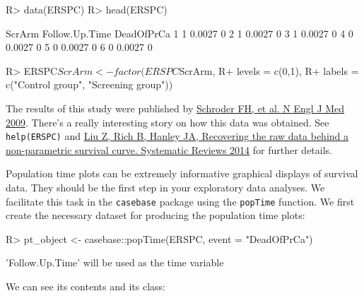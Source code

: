 \documentclass[article]{jss}
\begin{document}
\begin{CodeChunk}

\begin{CodeInput}
R> data(ERSPC)
R> head(ERSPC)
\end{CodeInput}

\begin{CodeOutput}
  ScrArm Follow.Up.Time DeadOfPrCa
1      1         0.0027          0
2      1         0.0027          0
3      1         0.0027          0
4      0         0.0027          0
5      0         0.0027          0
6      0         0.0027          0
\end{CodeOutput}

\begin{CodeInput}
R> ERSPC$ScrArm <- factor(ERSPC$ScrArm, 
R+                        levels = c(0,1), 
R+                        labels = c("Control group", "Screening group"))
\end{CodeInput}
\end{CodeChunk}

The results of this study were published by
\href{https://github.com/sahirbhatnagar/casebase/blob/master/references/Schroder_et_al-2009-NEJM.pdf}{Schroder
FH, et al. N Engl J Med 2009}. There's a really interesting story on how
this data was obtained. See \texttt{help(ERSPC)} and
\href{https://github.com/sahirbhatnagar/casebase/blob/master/references/Liu_et_al-2015-Systematic_Reviews.pdf}{Liu
Z, Rich B, Hanley JA, Recovering the raw data behind a non-parametric
survival curve. Systematic Reviews 2014} for further details.

Population time plots can be extremely informative graphical displays of
survival data. They should be the first step in your exploratory data
analyses. We facilitate this task in the \texttt{casebase} package using
the \texttt{popTime} function. We first create the necessary dataset for
producing the population time plots:

\begin{CodeChunk}

\begin{CodeInput}
R> pt_object <- casebase::popTime(ERSPC, event = "DeadOfPrCa")
\end{CodeInput}

\begin{CodeOutput}
'Follow.Up.Time' will be used as the time variable
\end{CodeOutput}
\end{CodeChunk}

We can see its contents and its class:
\end{document}
